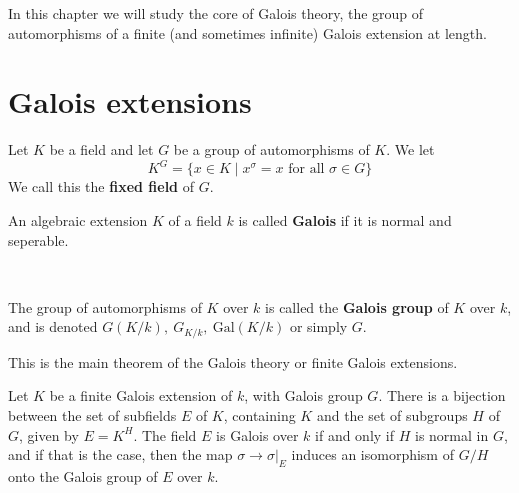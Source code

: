 
\newcommand{\Gal}{\text{Gal}}

In this chapter we will study the core of Galois theory, the group of automorphisms of a finite (and sometimes infinite) Galois extension at length.
    \section{Galois extensions}
\begin{definition}
    Let $K$ be a field and let $G$ be a group of automorphisms of $K$. We let \[K^G = \{x\in K\mid x^\sigma = x \text{ for all }\sigma \in G\}\]We call this the \textbf{fixed field} of $G$. 
\end{definition}

\begin{definition}
    An algebraic extension $K$ of a field $k$ is called \textbf{Galois} if it is normal and seperable.

    \

    The group of automorphisms of $K$ over $k$ is called the \textbf{Galois group} of $K$ over $k$, and is denoted $G(K/k), \ G_{K/k}, \ \Gal(K/k)$ or simply $G$.
\end{definition}

This is the main theorem of the Galois theory or finite Galois extensions.
\begin{theorem}\label{main}
    Let $K$ be a finite Galois extension of $k$, with Galois group $G$. There is a bijection between the set of subfields $E$ of $K$, containing $K$ and the set of subgroups $H$ of $G$, given by $E=K^H$. The field $E$ is Galois over $k$ if and only if $H$ is normal in $G$, and if that is the case, then the map $\sigma\rightarrow \sigma|_E$ induces an isomorphism
    of $G/H$ onto the Galois group of $E$ over $k$.
\end{theorem}



